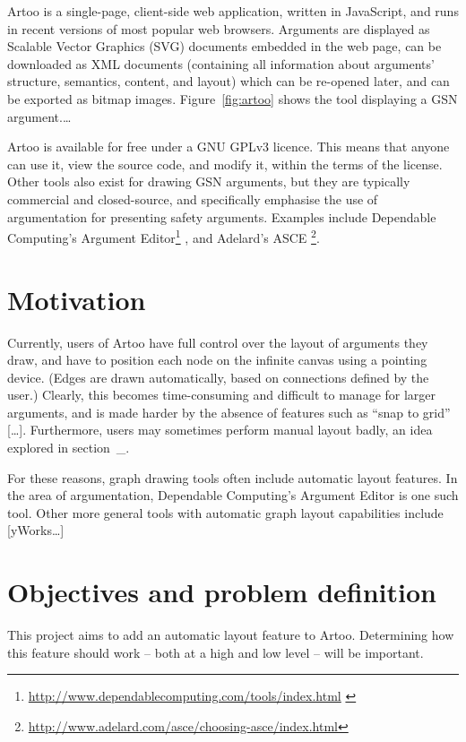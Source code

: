 Artoo is a single-page, client-side web application, written in JavaScript, and runs in recent versions of most popular web browsers.
Arguments are displayed as Scalable Vector Graphics (SVG) documents embedded in the web page, can be downloaded as XML documents (containing all information about arguments' structure, semantics, content, and layout) which can be re-opened later, and can be exported as bitmap images.
Figure~\ref{fig:artoo} shows the tool displaying a GSN argument.\ldots

Artoo is available for free under a GNU GPLv3 licence.
This means that anyone can use it, view the source code, and modify it, within the terms of the license.
Other tools also exist for drawing GSN arguments, but they are typically commercial and closed-source,  and specifically emphasise the use of argumentation for presenting safety arguments.
Examples include Dependable Computing's
Argument Editor\footnote{\url{http://www.dependablecomputing.com/tools/index.html} \label{fn:depcomp}}
, and Adelard's
ASCE \footnote{\url{http://www.adelard.com/asce/choosing-asce/index.html}}.


\section{Motivation}

Currently, users of Artoo have full control over the layout of arguments they draw, and have to position each node on the infinite canvas using a pointing device.
(Edges are drawn automatically, based on connections defined by the user.)
Clearly, this becomes time-consuming and difficult to manage for larger arguments, and is made harder by the absence of features such as ``snap to grid'' [\ldots].
Furthermore, users may sometimes perform manual layout badly, an idea explored in section~\_.

For these reasons, graph drawing tools often include automatic layout features.
In the area of argumentation, Dependable Computing's Argument Editor is one such tool. 
Other more general tools with automatic graph layout capabilities include [yWorks\ldots]


\section{Objectives and problem definition}

This project aims to add an automatic layout feature to Artoo.
Determining how this feature should work -- both at a high and low level -- will be important.

